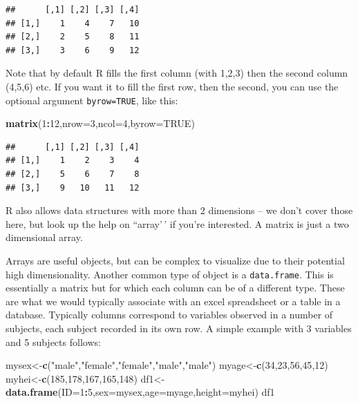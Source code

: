 \documentclass[
]{article}
\newenvironment{Shaded}{\begin{snugshade}}{\end{snugshade}}
\newcommand{\AttributeTok}[1]{\textcolor[rgb]{0.13,0.29,0.53}{#1}}
\newcommand{\ConstantTok}[1]{\textcolor[rgb]{0.56,0.35,0.01}{#1}}
\newcommand{\DecValTok}[1]{\textcolor[rgb]{0.00,0.00,0.81}{#1}}
\newcommand{\FunctionTok}[1]{\textcolor[rgb]{0.13,0.29,0.53}{\textbf{#1}}}
\newcommand{\NormalTok}[1]{#1}
\newcommand{\OtherTok}[1]{\textcolor[rgb]{0.56,0.35,0.01}{#1}}
\newcommand{\SpecialCharTok}[1]{\textcolor[rgb]{0.81,0.36,0.00}{\textbf{#1}}}
\newcommand{\StringTok}[1]{\textcolor[rgb]{0.31,0.60,0.02}{#1}}
\begin{document}
\begin{verbatim}
##      [,1] [,2] [,3] [,4]
## [1,]    1    4    7   10
## [2,]    2    5    8   11
## [3,]    3    6    9   12
\end{verbatim}

Note that by default R fills the first column (with 1,2,3) then the
second column (4,5,6) etc. If you want it to fill the first row, then
the second, you can use the optional argument \texttt{byrow=TRUE}, like
this:

\begin{Shaded}
\begin{Highlighting}[]
\FunctionTok{matrix}\NormalTok{(}\DecValTok{1}\SpecialCharTok{:}\DecValTok{12}\NormalTok{,}\AttributeTok{nrow=}\DecValTok{3}\NormalTok{,}\AttributeTok{ncol=}\DecValTok{4}\NormalTok{,}\AttributeTok{byrow=}\ConstantTok{TRUE}\NormalTok{)}
\end{Highlighting}
\end{Shaded}

\begin{verbatim}
##      [,1] [,2] [,3] [,4]
## [1,]    1    2    3    4
## [2,]    5    6    7    8
## [3,]    9   10   11   12
\end{verbatim}

R also allows data structures with more than 2 dimensions -- we don't
cover those here, but look up the help on ``array'\,' if you're
interested. A matrix is just a two dimensional array.

Arrays are useful objects, but can be complex to visualize due to their
potential high dimensionality. Another common type of object is a
\texttt{data.frame}. This is essentially a matrix but for which each
column can be of a different type. These are what we would typically
associate with an excel spreadsheet or a table in a database. Typically
columns correspond to variables observed in a number of subjects, each
subject recorded in its own row. A simple example with 3 variables and 5
subjects follows:

\begin{Shaded}
\begin{Highlighting}[]
\NormalTok{mysex}\OtherTok{\textless{}{-}}\FunctionTok{c}\NormalTok{(}\StringTok{"male"}\NormalTok{,}\StringTok{"female"}\NormalTok{,}\StringTok{"female"}\NormalTok{,}\StringTok{"male"}\NormalTok{,}\StringTok{"male"}\NormalTok{)}
\NormalTok{myage}\OtherTok{\textless{}{-}}\FunctionTok{c}\NormalTok{(}\DecValTok{34}\NormalTok{,}\DecValTok{23}\NormalTok{,}\DecValTok{56}\NormalTok{,}\DecValTok{45}\NormalTok{,}\DecValTok{12}\NormalTok{)}
\NormalTok{myhei}\OtherTok{\textless{}{-}}\FunctionTok{c}\NormalTok{(}\DecValTok{185}\NormalTok{,}\DecValTok{178}\NormalTok{,}\DecValTok{167}\NormalTok{,}\DecValTok{165}\NormalTok{,}\DecValTok{148}\NormalTok{)}
\NormalTok{df1}\OtherTok{\textless{}{-}}\FunctionTok{data.frame}\NormalTok{(}\AttributeTok{ID=}\DecValTok{1}\SpecialCharTok{:}\DecValTok{5}\NormalTok{,}\AttributeTok{sex=}\NormalTok{mysex,}\AttributeTok{age=}\NormalTok{myage,}\AttributeTok{height=}\NormalTok{myhei)}
\NormalTok{df1}
\end{Highlighting}
\end{Shaded}
\end{document}
